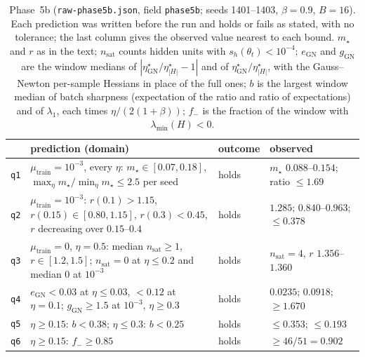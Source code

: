 \documentclass[11pt]{article}
\theoremstyle{remark}
\begin{document}
\begin{table}[!htbp]
\centering
\caption{Phase~5b (\texttt{raw-phase5b.json}, field \texttt{phase5b}; seeds 1401--1403, $\beta=0.9$, $B=16$). Each prediction was written before the run and holds or fails as stated, with no tolerance; the last column gives the observed value nearest to each bound. $m_\star$ and $r$ as in the text; $n_{\mathrm{sat}}$ counts hidden units with $s_h(\theta_t)<10^{-4}$; $e_{\mathrm{GN}}$ and $g_{\mathrm{GN}}$ are the window medians of $|\eta^\star_{\mathrm{GN}}/\eta^\star_{|H|}-1|$ and of $\eta^\star_{\mathrm{GN}}/\eta^\star_{|H|}$, with the Gauss--Newton per-sample Hessians in place of the full ones; $b$ is the largest window median of batch sharpness (expectation of the ratio and ratio of expectations) and of $\lambda_1$, each times $\eta/(2(1+\beta))$; $f_-$ is the fraction of the window with $\lambda_{\min}(H)<0$.}
\label{tab:phase5b}
\small
\begin{tabular}{@{}lp{}lp{}@{}}
\toprule
 & prediction (domain) & outcome & observed \\
\midrule
\texttt{q1} & $\mu_{\mathrm{train}}=10^{-3}$, every $\eta$: $m_\star\in[0.07,0.18]$, $\max_\eta m_\star/\min_\eta m_\star\le2.5$ per seed & holds & $m_\star$ $0.088$--$0.154$; ratio $\le1.69$ \\
\texttt{q2} & $\mu_{\mathrm{train}}=10^{-3}$: $r(0.1)>1.15$, $r(0.15)\in[0.80,1.15]$, $r(0.3)<0.45$, $r$ decreasing over $0.15$--$0.4$ & holds & $1.285$; $0.840$--$0.963$; $\le0.378$ \\
\texttt{q3} & $\mu_{\mathrm{train}}=0$, $\eta=0.5$: median $n_{\mathrm{sat}}\ge1$, $r\in[1.2,1.5]$; $n_{\mathrm{sat}}=0$ at $\eta\le0.2$ and median $0$ at $10^{-3}$ & holds & $n_{\mathrm{sat}}=4$, $r$ $1.356$--$1.360$ \\
\texttt{q4} & $e_{\mathrm{GN}}<0.03$ at $\eta\le0.03$, $<0.12$ at $\eta=0.1$; $g_{\mathrm{GN}}\ge1.5$ at $10^{-3}$, $\eta\ge0.3$ & holds & $0.0235$; $0.0918$; $\ge1.670$ \\
\texttt{q5} & $\eta\ge0.15$: $b<0.38$; $\eta\le0.3$: $b<0.25$ & holds & $\le0.353$; $\le0.193$ \\
\texttt{q6} & $\eta\ge0.15$: $f_-\ge0.85$ & holds & $\ge46/51=0.902$ \\
\bottomrule
\end{tabular}
\end{table}
\end{document}
